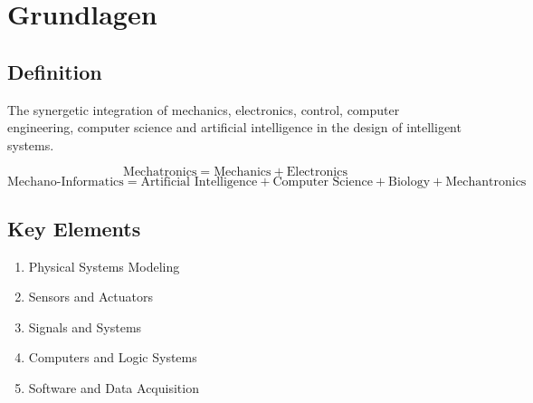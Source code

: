 

\section{Grundlagen}%
\label{g:sec:grundlagen}

\subsection{Definition}%
\label{g:sub:definition}
The synergetic integration of mechanics, electronics, control, computer engineering, computer science and
artificial intelligence in the design of intelligent systems.

\[\text{Mechatronics} = \text{Mechanics} + \text{Electronics}\]
\[\text{Mechano-Informatics} = \text{Artificial Intelligence} + \text{Computer Science} + \text{Biology}
  + \text{Mechantronics}\]

\subsection{Key Elements}%
\label{g:sub:key_elements}
\begin{enumerate}
\item Physical Systems Modeling
\item Sensors and Actuators
\item Signals and Systems
\item Computers and Logic Systems
\item Software and Data Acquisition
\end{enumerate}